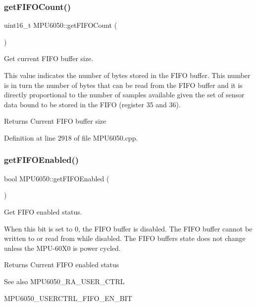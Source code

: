 \mbox{\label{classMPU6050_ad96c7a75a39327ebaae01386bcbc58dd}} 
\subsubsection{\texorpdfstring{getFIFOCount()}{getFIFOCount()}}
{\footnotesize\ttfamily uint16\+\_\+t M\+P\+U6050\+::get\+F\+I\+F\+O\+Count (\begin{DoxyParamCaption}{ }\end{DoxyParamCaption})}



Get current F\+I\+FO buffer size. 

This value indicates the number of bytes stored in the F\+I\+FO buffer. This number is in turn the number of bytes that can be read from the F\+I\+FO buffer and it is directly proportional to the number of samples available given the set of sensor data bound to be stored in the F\+I\+FO (register 35 and 36). \begin{DoxyReturn}{Returns}
Current F\+I\+FO buffer size 
\end{DoxyReturn}


Definition at line 2918 of file M\+P\+U6050.\+cpp.

\mbox{\label{classMPU6050_ae2687a09ebe0d7fbbf74f560e0dd9a44}} 
\subsubsection{\texorpdfstring{getFIFOEnabled()}{getFIFOEnabled()}}
{\footnotesize\ttfamily bool M\+P\+U6050\+::get\+F\+I\+F\+O\+Enabled (\begin{DoxyParamCaption}{ }\end{DoxyParamCaption})}



Get F\+I\+FO enabled status. 

When this bit is set to 0, the F\+I\+FO buffer is disabled. The F\+I\+FO buffer cannot be written to or read from while disabled. The F\+I\+FO buffer\textquotesingle{}s state does not change unless the M\+P\+U-\/60\+X0 is power cycled. \begin{DoxyReturn}{Returns}
Current F\+I\+FO enabled status 
\end{DoxyReturn}
\begin{DoxySeeAlso}{See also}
M\+P\+U6050\+\_\+\+R\+A\+\_\+\+U\+S\+E\+R\+\_\+\+C\+T\+RL 

M\+P\+U6050\+\_\+\+U\+S\+E\+R\+C\+T\+R\+L\+\_\+\+F\+I\+F\+O\+\_\+\+E\+N\+\_\+\+B\+IT 
\end{DoxySeeAlso}


